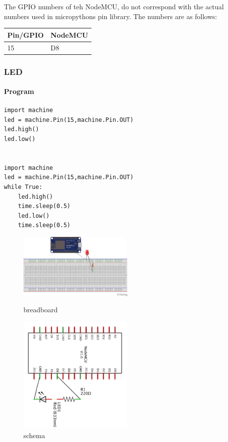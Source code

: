The GPIO numbers of teh NodeMCU, do not correspond with the actual
numbers used in micropythons pin library. The numbers are as follows:

\begin{longtable}[]{@{}ll@{}}
\toprule
Pin/GPIO & NodeMCU\tabularnewline
\midrule
\endhead
15 & D8\tabularnewline
\bottomrule
\end{longtable}

\subsubsection{LED}\label{led}

\paragraph{Program}\label{program}

\begin{verbatim}
import machine
led = machine.Pin(15,machine.Pin.OUT)
led.high()
led.low()


import machine
led = machine.Pin(15,machine.Pin.OUT)
while True:
    led.high()
    time.sleep(0.5)
    led.low()
    time.sleep(0.5)
\end{verbatim}

\begin{figure}[htb]
\centering
\includegraphics[width=0.5\textwidth]{../images/led-esp8266_bb.png}
\caption{breadboard}

\includegraphics[width=0.5\textwidth]{../images/led-esp8266_schem.png}
\caption{schema}
\end{figure}

